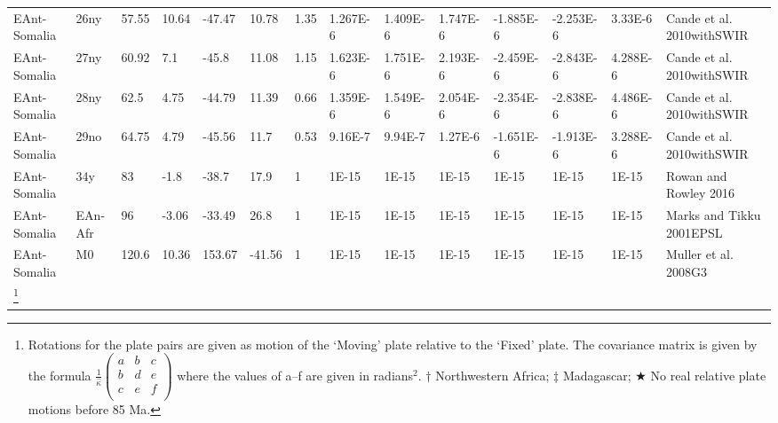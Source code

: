 \begin{landscape}
\begin{longtable}{@{}lllllllllllllp{3.5cm}@{}}
EAnt-Somalia & 26ny & 57.55 & 10.64 & -47.47 & 10.78 & 1.35 & 1.267E-6 & 1.409E-6 & 1.747E-6 & -1.885E-6 & -2.253E-6 & 3.33E-6 & Cande et al. 2010withSWIR \\
EAnt-Somalia & 27ny & 60.92 & 7.1 & -45.8 & 11.08 & 1.15 & 1.623E-6 & 1.751E-6 & 2.193E-6 & -2.459E-6 & -2.843E-6 & 4.288E-6 & Cande et al. 2010withSWIR \\
EAnt-Somalia & 28ny & 62.5 & 4.75 & -44.79 & 11.39 & 0.66 & 1.359E-6 & 1.549E-6 & 2.054E-6 & -2.354E-6 & -2.838E-6 & 4.486E-6 & Cande et al. 2010withSWIR \\
EAnt-Somalia & 29no & 64.75 & 4.79 & -45.56 & 11.7 & 0.53 & 9.16E-7 & 9.94E-7 & 1.27E-6 & -1.651E-6 & -1.913E-6 & 3.288E-6 & Cande et al. 2010withSWIR \\
EAnt-Somalia & 34y & 83 & -1.8 & -38.7 & 17.9 & 1 & 1E-15 & 1E-15 & 1E-15 & 1E-15 & 1E-15 & 1E-15 & Rowan and Rowley 2016 \\
EAnt-Somalia & EAn-Afr & 96 & -3.06 & -33.49 & 26.8 & 1 & 1E-15 & 1E-15 & 1E-15 & 1E-15 & 1E-15 & 1E-15 & Marks and Tikku 2001EPSL \\
EAnt-Somalia & M0 & 120.6 & 10.36 & 153.67 & -41.56 & 1 & 1E-15 & 1E-15 & 1E-15
& 1E-15 & 1E-15 & 1E-15 & Muller et al. 2008G3 \\* \bottomrule\let\thefootnote\relax\footnote{Rotations for the plate pairs are given as motion of the
`Moving' plate relative to the `Fixed' plate. The covariance matrix is given by
the formula $\frac{1}{\hat{\kappa}}\left( {\begin{array}{ccc}
   a & b & c\\
   b & d & e\\
   c & e & f\\ \end{array}} \right)$ where the values of a–f are given in
   radians$^2$. $\dagger$ Northwestern Africa; $\ddagger$ Madagascar;
   $\bigstar$ No real relative plate motions before 85 Ma.}
\end{longtable}
\end{landscape}

